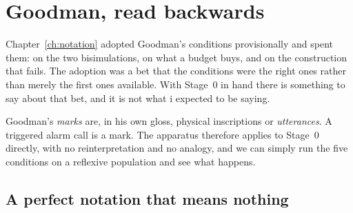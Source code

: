 \section{Goodman, read backwards}
\label{sec:goodman-backwards}

Chapter~\ref{ch:notation} adopted Goodman's conditions provisionally and spent
them: on the two bisimulations, on what a budget buys, and on the construction
that fails. The adoption was a bet that the conditions were the right ones rather
than merely the first ones available. With Stage~0 in hand there is something to
say about that bet, and it is not what i expected to be saying.

Goodman's \emph{marks} are, in his own gloss, physical inscriptions or
\emph{utterances}. A triggered alarm call is a mark. The apparatus therefore
applies to Stage~0 directly, with no reinterpretation and no analogy, and we can
simply run the five conditions on a reflexive population and see what happens.

\begin{table}[t]
\centering\small
{}
\caption{Goodman's five conditions evaluated on a reflexive signalling
population, and again after emission is decoupled from the sensor. The two
conditions the budget move of \S\ref{sec:budget} repairs are exactly the two
that deception leaves alone.}
\label{lie:tab:goodman}
\end{table}

\subsection{A perfect notation that means nothing}
\label{sec:perfect-notation}


